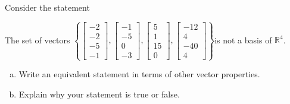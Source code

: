 
\begin{exerciseStatement}


Consider the statement 
\begin{center}\begin{minipage}{0.8\textwidth}
 The set of vectors \( \left\{ \left[\begin{array}{c}
-2 \\
-2 \\
-5 \\
-1
\end{array}\right] , \left[\begin{array}{c}
-1 \\
-5 \\
0 \\
-3
\end{array}\right] , \left[\begin{array}{c}
5 \\
1 \\
15 \\
0
\end{array}\right] , \left[\begin{array}{c}
-12 \\
4 \\
-40 \\
4
\end{array}\right] \right\} \)is not a basis of \(\mathbb{R}^4\). 
\end{minipage}\end{center}
    


\begin{enumerate}[(a)]
\item  Write an equivalent statement in terms of other vector properties.
\item  Explain why your statement is true or false.
\end{enumerate}
    
\end{exerciseStatement}
    

